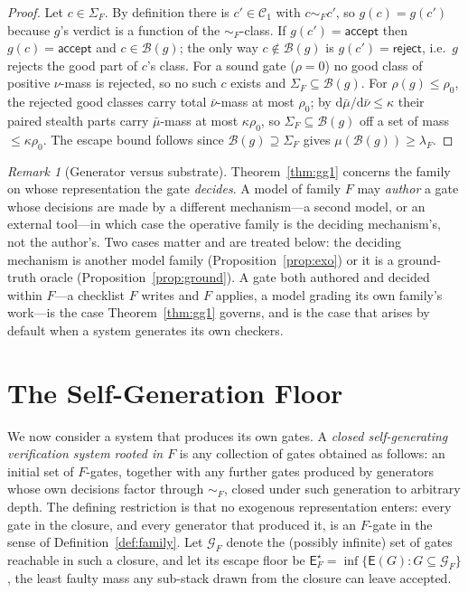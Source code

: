 \documentclass[11pt]{article}
\theoremstyle{definition}
\theoremstyle{remark}
\newtheorem{remark}{Remark}
\newcommand{\C}{\mathcal{C}}
\newcommand{\Cgood}{\C_{1}}
\newcommand{\simF}{\sim_{F}}
\newcommand{\SigF}{\Sigma_{F}}
\newcommand{\lF}{\lambda_{F}}
\newcommand{\B}{\mathcal{B}}
\newcommand{\E}{\mathsf{E}}
\begin{document}
\begin{proof}
Let $c\in\SigF$. By definition there is $c'\in\Cgood$ with $c\simF c'$, so $g(c)=g(c')$ because $g$'s
verdict is a function of the $\simF$-class. If $g(c')=\textsf{accept}$ then $g(c)=\textsf{accept}$ and
$c\in\B(g)$; the only way $c\notin\B(g)$ is $g(c')=\textsf{reject}$, i.e.\ $g$ rejects the good part of
$c$'s class. For a sound gate ($\rho=0$) no good class of positive $\nu$-mass is rejected, so no such
$c$ exists and $\SigF\subseteq\B(g)$. For $\rho(g)\le\rho_0$, the rejected good classes carry total
$\bar\nu$-mass at most $\rho_0$; by $\mathrm{d}\bar\mu/\mathrm{d}\bar\nu\le\kappa$ their paired stealth
parts carry $\bar\mu$-mass at most $\kappa\rho_0$, so $\SigF\subseteq\B(g)$ off a set of mass
$\le\kappa\rho_0$. The escape bound
follows since $\B(g)\supseteq\SigF$ gives $\mu(\B(g))\ge\lF$.
\end{proof}

\begin{remark}[Generator versus substrate]\label{rem:substrate}
Theorem~\ref{thm:gg1} concerns the family on whose representation the gate \emph{decides}. A model of
family $F$ may \emph{author} a gate whose decisions are made by a different mechanism---a second
model, or an external tool---in which case the operative family is the deciding mechanism's, not the
author's. Two cases matter and are treated below: the deciding mechanism is another model family
(Proposition~\ref{prop:exo}) or it is a ground-truth oracle (Proposition~\ref{prop:ground}). A gate
both authored and decided within $F$---a checklist $F$ writes and $F$ applies, a model grading its
own family's work---is the case Theorem~\ref{thm:gg1} governs, and is the case that arises by default
when a system generates its own checkers.
\end{remark}

\section{The Self-Generation Floor}\label{sec:gg2}

We now consider a system that produces its own gates. A \emph{closed self-generating verification
system rooted in $F$} is any collection of gates obtained as follows: an initial set of $F$-gates,
together with any further gates produced by generators whose own decisions factor through $\simF$,
closed under such generation to arbitrary depth. The defining restriction is that no exogenous
representation enters: every gate in the closure, and every generator that produced it, is an
$F$-gate in the sense of Definition~\ref{def:family}. Let $\mathcal{G}_F$ denote the (possibly
infinite) set of gates reachable in such a closure, and let its escape floor be
$\E^\star_F=\inf\{\E(G): G\subseteq\mathcal{G}_F\}$, the least faulty mass any sub-stack drawn from
the closure can leave accepted.
\end{document}
